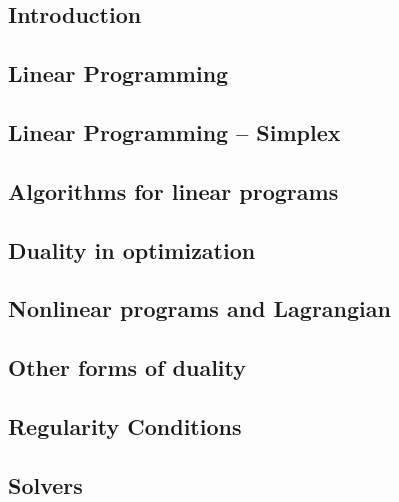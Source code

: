 \subsection{Introduction}


\subsection{Linear Programming}


\subsection{Linear Programming -- Simplex}


\subsection{Algorithms for linear programs}


\subsection{Duality in optimization}


\subsection{Nonlinear programs and Lagrangian}


\subsection{Other forms of duality}


\subsection{Regularity Conditions}


\subsection{Solvers}

